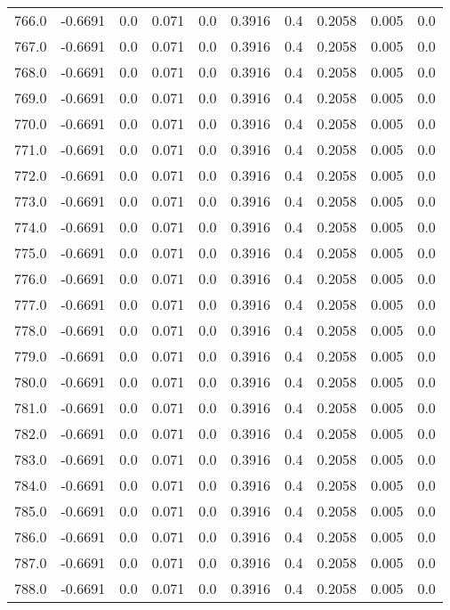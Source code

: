 \begin{longtable}{lrrrrrrrrr}
766.0 & -0.6691 & 0.0 & 0.071 & 0.0 & 0.3916 & 0.4 & 0.2058 & 0.005 & 0.0 \\
767.0 & -0.6691 & 0.0 & 0.071 & 0.0 & 0.3916 & 0.4 & 0.2058 & 0.005 & 0.0 \\
768.0 & -0.6691 & 0.0 & 0.071 & 0.0 & 0.3916 & 0.4 & 0.2058 & 0.005 & 0.0 \\
769.0 & -0.6691 & 0.0 & 0.071 & 0.0 & 0.3916 & 0.4 & 0.2058 & 0.005 & 0.0 \\
770.0 & -0.6691 & 0.0 & 0.071 & 0.0 & 0.3916 & 0.4 & 0.2058 & 0.005 & 0.0 \\
771.0 & -0.6691 & 0.0 & 0.071 & 0.0 & 0.3916 & 0.4 & 0.2058 & 0.005 & 0.0 \\
772.0 & -0.6691 & 0.0 & 0.071 & 0.0 & 0.3916 & 0.4 & 0.2058 & 0.005 & 0.0 \\
773.0 & -0.6691 & 0.0 & 0.071 & 0.0 & 0.3916 & 0.4 & 0.2058 & 0.005 & 0.0 \\
774.0 & -0.6691 & 0.0 & 0.071 & 0.0 & 0.3916 & 0.4 & 0.2058 & 0.005 & 0.0 \\
775.0 & -0.6691 & 0.0 & 0.071 & 0.0 & 0.3916 & 0.4 & 0.2058 & 0.005 & 0.0 \\
776.0 & -0.6691 & 0.0 & 0.071 & 0.0 & 0.3916 & 0.4 & 0.2058 & 0.005 & 0.0 \\
777.0 & -0.6691 & 0.0 & 0.071 & 0.0 & 0.3916 & 0.4 & 0.2058 & 0.005 & 0.0 \\
778.0 & -0.6691 & 0.0 & 0.071 & 0.0 & 0.3916 & 0.4 & 0.2058 & 0.005 & 0.0 \\
779.0 & -0.6691 & 0.0 & 0.071 & 0.0 & 0.3916 & 0.4 & 0.2058 & 0.005 & 0.0 \\
780.0 & -0.6691 & 0.0 & 0.071 & 0.0 & 0.3916 & 0.4 & 0.2058 & 0.005 & 0.0 \\
781.0 & -0.6691 & 0.0 & 0.071 & 0.0 & 0.3916 & 0.4 & 0.2058 & 0.005 & 0.0 \\
782.0 & -0.6691 & 0.0 & 0.071 & 0.0 & 0.3916 & 0.4 & 0.2058 & 0.005 & 0.0 \\
783.0 & -0.6691 & 0.0 & 0.071 & 0.0 & 0.3916 & 0.4 & 0.2058 & 0.005 & 0.0 \\
784.0 & -0.6691 & 0.0 & 0.071 & 0.0 & 0.3916 & 0.4 & 0.2058 & 0.005 & 0.0 \\
785.0 & -0.6691 & 0.0 & 0.071 & 0.0 & 0.3916 & 0.4 & 0.2058 & 0.005 & 0.0 \\
786.0 & -0.6691 & 0.0 & 0.071 & 0.0 & 0.3916 & 0.4 & 0.2058 & 0.005 & 0.0 \\
787.0 & -0.6691 & 0.0 & 0.071 & 0.0 & 0.3916 & 0.4 & 0.2058 & 0.005 & 0.0 \\
788.0 & -0.6691 & 0.0 & 0.071 & 0.0 & 0.3916 & 0.4 & 0.2058 & 0.005 & 0.0 \\

\end{longtable}
